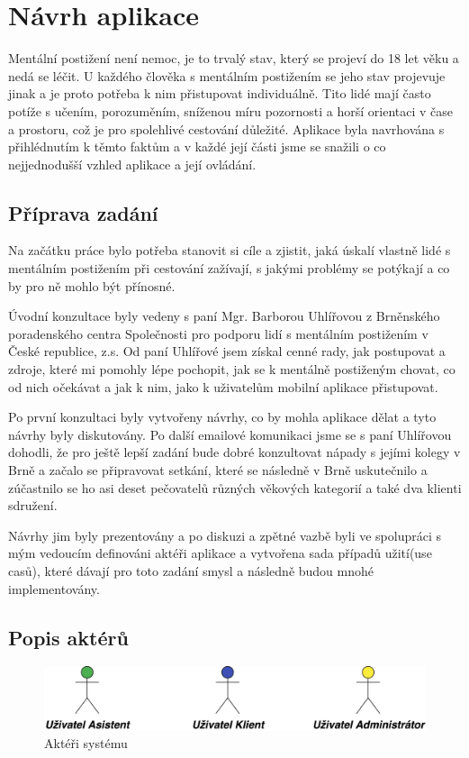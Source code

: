 \documentclass[czech,master,public,dept460,male,java,cpdeclaration]{diploma}
\begin{document}
\section{Návrh aplikace}
Mentální postižení není nemoc, je to trvalý stav, který se projeví do 18 let věku a nedá se léčit\cite{komunikace}.
U každého člověka s mentálním postižením se jeho stav projevuje jinak a je proto potřeba k nim
přistupovat individuálně. Tito lidé mají často potíže s učením, porozuměním, sníženou míru pozornosti
a horší orientaci v čase a prostoru\cite{komunikace}, což je pro spolehlivé cestování důležité.
Aplikace byla navrhována s přihlédnutím k těmto faktům a v každé její části jsme se snažili o co nejjednodušší
vzhled aplikace a její ovládání.


\subsection{Příprava zadání}
Na začátku práce bylo potřeba stanovit si cíle a zjistit, jaká úskalí vlastně lidé s mentálním
postižením při cestování zažívají, s jakými problémy se potýkají a co by pro ně mohlo být přínosné.

Úvodní konzultace byly vedeny s paní Mgr. Barborou Uhlířovou z Brněnského poradenského centra
Společnosti pro podporu lidí s mentálním postižením v České republice, z.s. Od paní Uhlířové jsem
získal cenné rady, jak postupovat a zdroje, které mi pomohly lépe pochopit, jak se k mentálně postiženým chovat,
 co od nich očekávat a jak k nim, jako k uživatelům mobilní aplikace přistupovat.

Po první konzultaci byly vytvořeny návrhy, co by mohla aplikace dělat a tyto návrhy byly diskutovány.
Po další emailové komunikaci jsme se s paní Uhlířovou dohodli, že pro ještě lepší zadání bude
dobré konzultovat nápady s jejími kolegy v Brně a začalo se připravovat setkání, které se následně
v Brně uskutečnilo a zúčastnilo se ho asi deset pečovatelů různých věkových kategorií a také dva klienti
sdružení.

Návrhy jim byly prezentovány a po diskuzi a zpětné vazbě byli ve spolupráci s mým vedoucím definováni
aktéři aplikace a vytvořena sada případů užití(use casů), které dávají pro toto zadání smysl a následně
budou mnohé implementovány.

\subsection{Popis aktérů}
\begin{figure}[H]
        \centering
                \includegraphics[scale=0.14]{img/actors.png}
        \caption{Aktéři systému}
        \label{fig:actors}
\end{figure}
\end{document}
